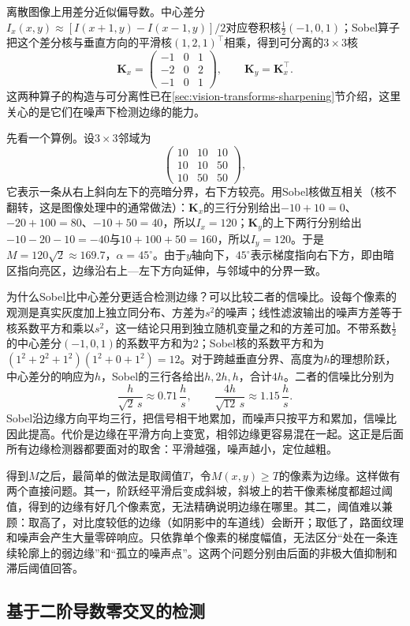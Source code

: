 离散图像上用差分近似偏导数。中心差分$I_x(x,y)\approx[I(x+1,y)-I(x-1,y)]/2$对应卷积核$\tfrac12(-1,0,1)$；Sobel算子把这个差分核与垂直方向的平滑核$(1,2,1)^{\top}$相乘，得到可分离的$3\times3$核
\[
  \bm K_x=\begin{pmatrix}-1&0&1\\-2&0&2\\-1&0&1\end{pmatrix},\qquad
  \bm K_y=\bm K_x^{\top}.
\]
这两种算子的构造与可分离性已在\ref{sec:vision-transforms-sharpening}节介绍，这里关心的是它们在噪声下检测边缘的能力。

先看一个算例。设$3\times3$邻域为
\[
  \begin{pmatrix}10&10&10\\10&10&50\\10&50&50\end{pmatrix},
\]
它表示一条从右上斜向左下的亮暗分界，右下方较亮。用Sobel核做互相关（核不翻转，这是图像处理中的通常做法）：$\bm K_x$的三行分别给出$-10+10=0$、$-20+100=80$、$-10+50=40$，所以$I_x=120$；$\bm K_y$的上下两行分别给出$-10-20-10=-40$与$10+100+50=160$，所以$I_y=120$。于是$M=120\sqrt2\approx169.7$，$\alpha=45^\circ$。由于$y$轴向下，$45^\circ$表示梯度指向右下方，即由暗区指向亮区，边缘沿右上—左下方向延伸，与邻域中的分界一致。

为什么Sobel比中心差分更适合检测边缘？可以比较二者的信噪比。设每个像素的观测是真实灰度加上独立同分布、方差为$s^2$的噪声；线性滤波输出的噪声方差等于核系数平方和乘以$s^2$，这一结论只用到独立随机变量之和的方差可加。不带系数$\tfrac12$的中心差分$(-1,0,1)$的系数平方和为$2$；Sobel核的系数平方和为$(1^2+2^2+1^2)(1^2+0+1^2)=12$。对于跨越垂直分界、高度为$h$的理想阶跃，中心差分的响应为$h$，Sobel的三行各给出$h,2h,h$，合计$4h$。二者的信噪比分别为
\[
  \frac{h}{\sqrt2\,s}\approx0.71\,\frac hs,\qquad
  \frac{4h}{\sqrt{12}\,s}\approx1.15\,\frac hs.
\]
Sobel沿边缘方向平均三行，把信号相干地累加，而噪声只按平方和累加，信噪比因此提高。代价是边缘在平滑方向上变宽，相邻边缘更容易混在一起。这正是后面所有边缘检测器都要面对的取舍：平滑越强，噪声越小，定位越粗。

得到$M$之后，最简单的做法是取阈值$T$，令$M(x,y)\geq T$的像素为边缘。这样做有两个直接问题。其一，阶跃经平滑后变成斜坡，斜坡上的若干像素梯度都超过阈值，得到的边缘有好几个像素宽，无法精确说明边缘在哪里。其二，阈值难以兼顾：取高了，对比度较低的边缘（如阴影中的车道线）会断开；取低了，路面纹理和噪声会产生大量零碎响应。只依靠单个像素的梯度幅值，无法区分“处在一条连续轮廓上的弱边缘”和“孤立的噪声点”。这两个问题分别由后面的非极大值抑制和滞后阈值回答。

\subsection{基于二阶导数零交叉的检测}
\label{sec:vision-features-log}

